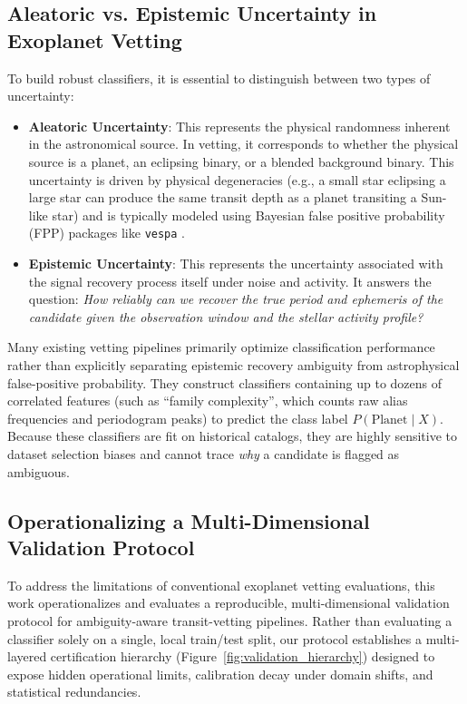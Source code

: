 \subsection{Aleatoric vs. Epistemic Uncertainty in Exoplanet Vetting} \label{sec:uncertainty_types}
To build robust classifiers, it is essential to distinguish between two types of uncertainty:
\begin{itemize}
\item \textbf{Aleatoric Uncertainty}: This represents the physical randomness inherent in the astronomical source. In vetting, it corresponds to whether the physical source is a planet, an eclipsing binary, or a blended background binary. This uncertainty is driven by physical degeneracies (e.g., a small star eclipsing a large star can produce the same transit depth as a planet transiting a Sun-like star) and is typically modeled using Bayesian false positive probability (FPP) packages like \texttt{vespa} \citep{Morton2012, Morton2015}.
\item \textbf{Epistemic Uncertainty}: This represents the uncertainty associated with the signal recovery process itself under noise and activity. It answers the question: \textit{How reliably can we recover the true period and ephemeris of the candidate given the observation window and the stellar activity profile?}
\end{itemize}

Many existing vetting pipelines primarily optimize classification performance rather than explicitly separating epistemic recovery ambiguity from astrophysical false-positive probability. They construct classifiers containing up to dozens of correlated features (such as ``family complexity'', which counts raw alias frequencies and periodogram peaks) to predict the class label $P(\text{Planet} \mid X)$. Because these classifiers are fit on historical catalogs, they are highly sensitive to dataset selection biases and cannot trace \textit{why} a candidate is flagged as ambiguous.

\subsection{Operationalizing a Multi-Dimensional Validation Protocol} \label{sec:contribution}

To address the limitations of conventional exoplanet vetting evaluations, this work operationalizes and evaluates a reproducible, multi-dimensional validation protocol for ambiguity-aware transit-vetting pipelines. Rather than evaluating a classifier solely on a single, local train/test split, our protocol establishes a multi-layered certification hierarchy (Figure~\ref{fig:validation_hierarchy}) designed to expose hidden operational limits, calibration decay under domain shifts, and statistical redundancies.


